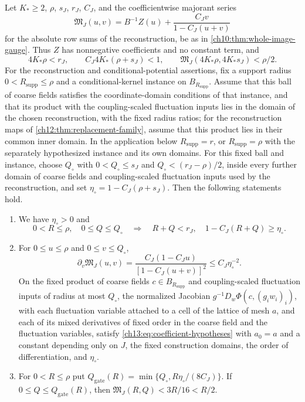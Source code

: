 \begin{lemma}\label{ch13:lem:reconstruction-domain}
Let $K_*\ge2$, $\rho$, $s_J$, $r_J$, $C_J$, and the coefficientwise majorant series
\[
 \mathfrak M_J(u,v)=B^{-1}Z(u)+\frac{C_Jv}{1-C_J(u+v)}
\]
for the absolute row sums of the reconstruction, be as in \cref{ch10:thm:whole-image-gauge}. Thus $Z$ has nonnegative coefficients and no constant term, and
\[
 4K_*\rho<r_J,\qquad C_J4K_*(\rho+s_J)<1,\qquad\mathfrak M_J(4K_*\rho,4K_*s_J)<\rho/2.
\]
For the reconstruction and conditional-potential assertions, fix a support radius $0<R_{\mathrm{supp}}\le\rho$ and a conditional-kernel instance on $B_{R_{\mathrm{supp}}}$. Assume that this ball of coarse fields satisfies the coordinate-domain conditions of that instance, and that its product with the coupling-scaled fluctuation inputs lies in the domain of the chosen reconstruction, with the fixed radius ratios; for the reconstruction maps of \cref{ch12:thm:replacement-family}, assume that this product lies in their common inner domain. In the application below $R_{\mathrm{supp}}=r$, or $R_{\mathrm{supp}}=\rho$ with the separately hypothesized instance and its own domains. For this fixed ball and instance, choose $Q_\circ$ with $0<Q_\circ\le s_J$ and $Q_\circ<(r_J-\rho)/2$, inside every further domain of coarse fields and coupling-scaled fluctuation inputs used by the reconstruction, and set $\eta_\circ=1-C_J(\rho+s_J)$. Then the following statements hold.
\begin{enumerate}
\item We have $\eta_\circ>0$ and
\begin{equation}\label{ch13:eq:reserved-product}
 0<R\le\rho,\quad0\le Q\le Q_\circ\quad\Longrightarrow\quad R+Q<r_J,\quad1-C_J(R+Q)\ge\eta_\circ.
\end{equation}
\item For $0\le u\le\rho$ and $0\le v\le Q_\circ$,
\[
 \partial_v\mathfrak M_J(u,v)=\frac{C_J(1-C_Ju)}{[1-C_J(u+v)]^2}\le C_J\eta_\circ^{-2}.
\]
On the fixed product of coarse fields $c\in B_{R_{\mathrm{supp}}}$ and coupling-scaled fluctuation inputs of radius at most $Q_\circ$, the normalized Jacobian $g^{-1}D_w\Phi(c,(g_iw_i)_i)$, with each fluctuation variable attached to a cell of the lattice of mesh $a$, and each of its mixed derivatives of fixed order in the coarse field and the fluctuation variables, satisfy \eqref{ch13:eq:coefficient-hypotheses} with $a_0=a$ and a constant depending only on $J$, the fixed construction domains, the order of differentiation, and $\eta_\circ$.
\item For $0<R\le\rho$ put $Q_{\mathrm{gate}}(R)=\min\{Q_\circ,R\eta_\circ/(8C_J)\}$. If $0\le Q\le Q_{\mathrm{gate}}(R)$, then $\mathfrak M_J(R,Q)<3R/16<R/2$.

\end{enumerate}
\end{lemma}
